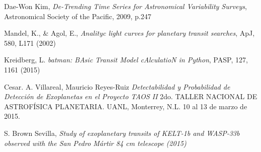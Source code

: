 \begin{thebibliography}{99}
 Dae-Won Kim, \textit {De-Trending Time Series for Astronomical Variability Surveys}, Astronomical Society of the Pacific, 2009, p.247 

 Mandel, K., \& Agol, E., \textit{Analityc light curves for planetary transit searches}, ApJ, 580, L171 (2002)

 Kreidberg, L. \textit{batman: BAsic Transit Model cAlculatioN in Python}, PASP, 127, 1161 (2015)


 Cesar. A. Villareal, Mauricio Reyes-Ruiz \textit{Detectabilidad y Probabilidad de Detección de Exoplanetas en el Proyecto TAOS II} 2do. TALLER NACIONAL DE ASTROFÍSICA PLANETARIA. UANL, Monterrey, N.L. 10 al 13 de marzo de 2015.

 S. Brown Sevilla, \textit{Study of exoplanetary transits of KELT-1b and WASP-33b observed with the San Pedro Mártir 84 cm telescope (2015)}








\end{thebibliography}
